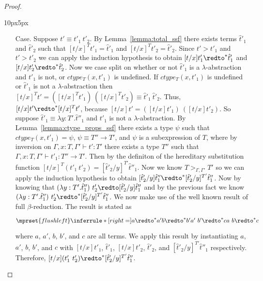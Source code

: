 \begin{proof}
\begin{changemargin}{10px}{5px}
\begin{itemize}
\item[Case.] Suppose $t' \equiv t'_1\ t'_2$.  By Lemma~\ref{lemma:total_ssf}
  there exists terms $\hat{t}'_1$ and $\hat{t}'_2$
  such that $[t/x]^T t'_1 = \hat{t}'_1$ and $[t/x]^T t'_2 = \hat{t}'_2$.  Since
  $t' > t'_1$ and $t' > t'_2$ we can apply the induction hypothesis to obtain
  $[t/x]t'_1 \redto^* \hat{t}'_1$ and $[t/x]t'_2 \redto^* \hat{t}'_2$.  Now we case
  split on whether or not $\hat{t}'_1$ is a $\lambda$-abstraction and $t'_1$ is not, or $ctype_T(x,t'_1)$ is undefined. If
  $ctype_T(x,t'_1)$ is undefined or $\hat{t}'_1$ is not a $\lambda$-abstraction then 
  $[t/x]^T t' = ([t/x]^T t'_1)\ ([t/x]^T t'_2) \equiv \hat{t}'_1\ \hat{t}'_2$. Thus,
  $[t/x]t' \redto^* [t/x]^T t'$, because $[t/x]t' = ([t/x] t'_1)\ ([t/x] t'_2)$.  So suppose 
  $\hat{t}'_1 \equiv \lambda y:T'.\hat{t}''_1$ and $t'_1$ is not a $\lambda$-abstraction.  
  By Lemma~\ref{lemma:ctype_props_ssf} there exists a type $\psi$ such that
  $ctype_T(x,t'_1) = \psi$, $\psi \equiv T'' \to T'$, and $\psi$ is a subexpression
  of $T$, where by inversion on $\Gamma,x:T,\Gamma' \vdash t':T'$ there exists a type
  $T''$ such that $\Gamma,x:T,\Gamma' \vdash t'_1:T'' \to T'$.  
  Then by the definiton of the hereditary substitution function $[t/x]^T (t'_1\ t'_2) = 
  [\hat{t}'_2/y]^{T'} \hat{t}''_1$.
  Now we know $T >_{\Gamma,\Gamma'} T'$ so 
  we can apply the induction hypothesis to obtain 
  $[\hat{t}'_2/y] \hat{t}''_1 \redto^* [\hat{t}'_2/y]^{T'} \hat{t}''_1$.  Now by knowing that 
  $(\lambda y:T'.\hat{t}''_1)\ t'_2 \redto [\hat{t}'_2/y] \hat{t}''_1$ and
  by the previous fact we know $(\lambda y:T'.\hat{t}''_1)\ t'_2 \redto^* [\hat{t}'_2/y]^{T'} \hat{t}''_1$.
  We now make use of the well known result of full $\beta$-reduction.  The
  result is stated as
  \begin{center}
    \begin{math}
      $$\mprset{flushleft}
      \inferrule* [right=] {
        a \redto^* a'
        \\\\
        b \redto^* b'
        \\
        a'\ b' \redto^* c
      }{a\ b \redto^* c}
    \end{math}
  \end{center}
  where $a$, $a'$, $b$, $b'$, and $c$ are all terms.  We apply this
  result by instantiating $a$, $a'$, $b$, $b'$, and $c$ with
  $[t/x] t'_1$, $\hat{t}'_1$, $[t/x] t'_2$, $\hat{t}'_2$, and $[\hat{t}'_2/y]^{T'} \hat{t}''_1$ 
  respectively.  Therefore, $[t/x](t'_1\ t'_2) \redto^* [\hat{t}'_2/y]^{T'} \hat{t}''_1$.    
  

\end{itemize}
\end{changemargin}
\end{proof}
